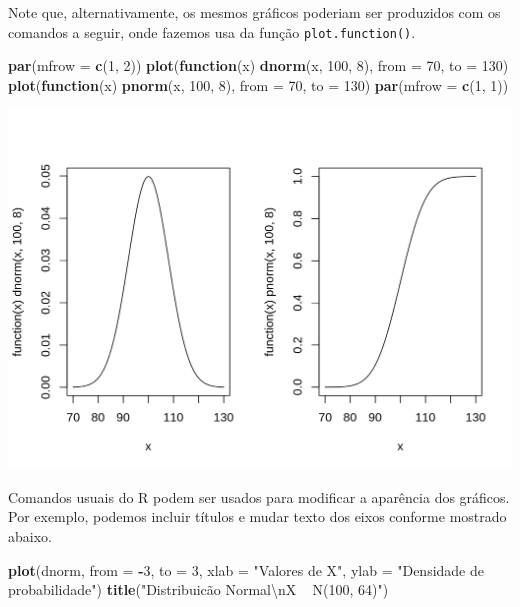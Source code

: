 \documentclass[10pt,a4paper]{book}
\newenvironment{Shaded}{\begin{snugshade}}{\end{snugshade}}
\newcommand{\KeywordTok}[1]{\textcolor[rgb]{0.13,0.29,0.53}{\textbf{#1}}}
\newcommand{\DataTypeTok}[1]{\textcolor[rgb]{0.13,0.29,0.53}{#1}}
\newcommand{\DecValTok}[1]{\textcolor[rgb]{0.00,0.00,0.81}{#1}}
\newcommand{\CharTok}[1]{\textcolor[rgb]{0.31,0.60,0.02}{#1}}
\newcommand{\StringTok}[1]{\textcolor[rgb]{0.31,0.60,0.02}{#1}}
\newcommand{\ControlFlowTok}[1]{\textcolor[rgb]{0.13,0.29,0.53}{\textbf{#1}}}
\newcommand{\OperatorTok}[1]{\textcolor[rgb]{0.81,0.36,0.00}{\textbf{#1}}}
\newcommand{\NormalTok}[1]{#1}
\begin{document}
Note que, alternativamente, os mesmos gráficos poderiam ser produzidos
com os comandos a seguir, onde fazemos usa da função
\texttt{plot.function()}.

\begin{Shaded}
\begin{Highlighting}[]
\KeywordTok{par}\NormalTok{(}\DataTypeTok{mfrow =} \KeywordTok{c}\NormalTok{(}\DecValTok{1}\NormalTok{, }\DecValTok{2}\NormalTok{))}
\KeywordTok{plot}\NormalTok{(}\ControlFlowTok{function}\NormalTok{(x) }\KeywordTok{dnorm}\NormalTok{(x, }\DecValTok{100}\NormalTok{, }\DecValTok{8}\NormalTok{), }\DataTypeTok{from =} \DecValTok{70}\NormalTok{, }\DataTypeTok{to =} \DecValTok{130}\NormalTok{)}
\KeywordTok{plot}\NormalTok{(}\ControlFlowTok{function}\NormalTok{(x) }\KeywordTok{pnorm}\NormalTok{(x, }\DecValTok{100}\NormalTok{, }\DecValTok{8}\NormalTok{), }\DataTypeTok{from =} \DecValTok{70}\NormalTok{, }\DataTypeTok{to =} \DecValTok{130}\NormalTok{)}
\KeywordTok{par}\NormalTok{(}\DataTypeTok{mfrow =} \KeywordTok{c}\NormalTok{(}\DecValTok{1}\NormalTok{, }\DecValTok{1}\NormalTok{))}
\end{Highlighting}
\end{Shaded}

\begin{center}\includegraphics{figures/unnamed-chunk-343-1} \end{center}

Comandos usuais do R podem ser usados para modificar a aparência dos
gráficos. Por exemplo, podemos incluir títulos e mudar texto dos eixos
conforme mostrado abaixo.

\begin{Shaded}
\begin{Highlighting}[]
\KeywordTok{plot}\NormalTok{(dnorm, }\DataTypeTok{from =} \OperatorTok{-}\DecValTok{3}\NormalTok{, }\DataTypeTok{to =} \DecValTok{3}\NormalTok{,}
     \DataTypeTok{xlab =} \StringTok{"Valores de X"}\NormalTok{,}
     \DataTypeTok{ylab =} \StringTok{"Densidade de probabilidade"}\NormalTok{)}
\KeywordTok{title}\NormalTok{(}\StringTok{"Distribuicão Normal}\CharTok{\textbackslash{}n}\StringTok{X ~ N(100, 64)"}\NormalTok{)}
\end{Highlighting}
\end{Shaded}
\end{document}
